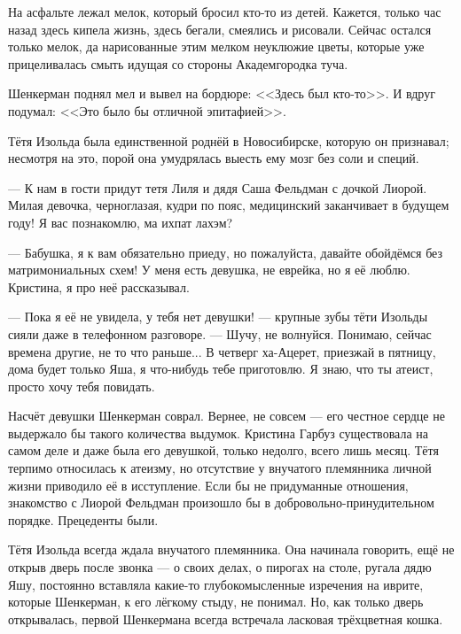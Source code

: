 На асфальте лежал мелок, который бросил кто-то из детей.
Кажется, только час назад здесь кипела жизнь, здесь бегали, смеялись и рисовали.
Сейчас остался только мелок, да нарисованные этим мелком неуклюжие цветы, которые уже прицеливалась смыть идущая со стороны Академгородка туча.

Шенкерман поднял мел и вывел на бордюре: <<Здесь был кто-то>>.
И вдруг подумал: <<Это было бы отличной эпитафией>>.

\asterism

\textspace

Тётя Изольда была единственной роднёй в Новосибирске, которую он признавал;
несмотря на это, порой она умудрялась выесть ему мозг без соли и специй.

--- К нам в гости придут тетя Лиля и дядя Саша Фельдман с дочкой Лиорой.
Милая девочка, черноглазая, кудри по пояс, медицинский заканчивает в будущем году!
Я вас познакомлю, ма ихпат лахэм?

--- Бабушка, я к вам обязательно приеду, но пожалуйста, давайте обойдёмся без матримониальных схем!
У меня есть девушка, не еврейка, но я её люблю.
Кристина, я про неё рассказывал.

--- Пока я её не увидела, у тебя нет девушки! --- крупные зубы тёти Изольды сияли даже в телефонном разговоре.
--- Шучу, не волнуйся.
Понимаю, сейчас времена другие, не то что раньше...
В четверг ха-Ацерет, приезжай в пятницу, дома будет только Яша, я что-нибудь тебе приготовлю.
Я знаю, что ты атеист, просто хочу тебя повидать.

Насчёт девушки Шенкерман соврал.
Вернее, не совсем --- его честное сердце не выдержало бы такого количества выдумок.
Кристина Гарбуз существовала на самом деле и даже была его девушкой, только недолго, всего лишь месяц.
Тётя терпимо относилась к атеизму, но отсутствие у внучатого племянника личной жизни приводило её в исступление.
Если бы не придуманные отношения, знакомство с Лиорой Фельдман произошло бы в добровольно-принудительном порядке.
Прецеденты были.

\asterism

\textspace

Тётя Изольда всегда ждала внучатого племянника.
Она начинала говорить, ещё не открыв дверь после звонка --- о своих делах, о пирогах на столе, ругала дядю Яшу, постоянно вставляла какие-то глубокомысленные изречения на иврите, которые Шенкерман, к его лёгкому стыду, не понимал.
Но, как только дверь открывалась, первой Шенкермана всегда встречала ласковая трёхцветная кошка.

